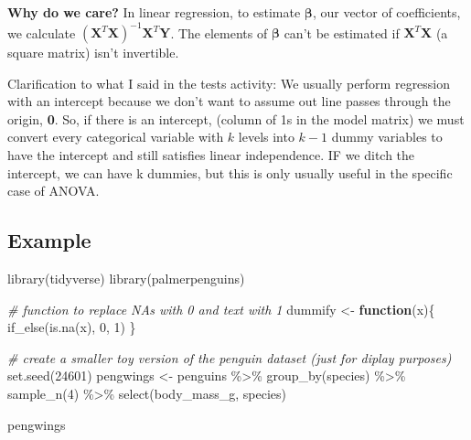 \documentclass[
  openany]{book}
\newenvironment{Shaded}{\begin{snugshade}}{\end{snugshade}}
\newcommand{\CommentTok}[1]{\textcolor[rgb]{0.56,0.35,0.01}{\textit{#1}}}
\newcommand{\ControlFlowTok}[1]{\textcolor[rgb]{0.13,0.29,0.53}{\textbf{#1}}}
\newcommand{\DecValTok}[1]{\textcolor[rgb]{0.00,0.00,0.81}{#1}}
\newcommand{\FunctionTok}[1]{\textcolor[rgb]{0.00,0.00,0.00}{#1}}
\newcommand{\NormalTok}[1]{#1}
\newcommand{\OtherTok}[1]{\textcolor[rgb]{0.56,0.35,0.01}{#1}}
\newcommand{\SpecialCharTok}[1]{\textcolor[rgb]{0.00,0.00,0.00}{#1}}
\begin{document}
\textbf{Why do we care?} In linear regression, to estimate \(\boldsymbol\beta\), our vector of coefficients, we calculate \((\boldsymbol X^T\boldsymbol X)^{-1}\boldsymbol X^T\boldsymbol Y\). The elements of \(\boldsymbol\beta\) can't be estimated if \(\boldsymbol X^T\boldsymbol X\) (a square matrix) isn't invertible.

Clarification to what I said in the tests activity: We usually perform regression with an intercept because we don't want to assume out line passes through the origin, \textbf{0}. So, if there is an intercept, (column of 1s in the model matrix) we must convert every categorical variable with \(k\) levels into \(k-1\) dummy variables to have the intercept and still satisfies linear independence. IF we ditch the intercept, we can have k dummies, but this is only usually useful in the specific case of ANOVA.

\hypertarget{example-4}{%
\subsection{Example}\label{example-4}}

\begin{Shaded}
\begin{Highlighting}[]
\FunctionTok{library}\NormalTok{(tidyverse)}
\FunctionTok{library}\NormalTok{(palmerpenguins)}
\end{Highlighting}
\end{Shaded}

\begin{Shaded}
\begin{Highlighting}[]
\CommentTok{\# function to replace NAs with 0 and text with 1}
\NormalTok{dummify }\OtherTok{\textless{}{-}} \ControlFlowTok{function}\NormalTok{(x)\{}
  \FunctionTok{if\_else}\NormalTok{(}\FunctionTok{is.na}\NormalTok{(x), }\DecValTok{0}\NormalTok{, }\DecValTok{1}\NormalTok{)}
\NormalTok{\}}

\CommentTok{\# create a smaller toy version of the penguin dataset (just for diplay purposes)}
\FunctionTok{set.seed}\NormalTok{(}\DecValTok{24601}\NormalTok{)}
\NormalTok{pengwings }\OtherTok{\textless{}{-}}\NormalTok{ penguins }\SpecialCharTok{\%\textgreater{}\%} 
  \FunctionTok{group\_by}\NormalTok{(species) }\SpecialCharTok{\%\textgreater{}\%} 
  \FunctionTok{sample\_n}\NormalTok{(}\DecValTok{4}\NormalTok{) }\SpecialCharTok{\%\textgreater{}\%} 
  \FunctionTok{select}\NormalTok{(body\_mass\_g, species)}

\NormalTok{pengwings}
\end{Highlighting}
\end{Shaded}
\end{document}
